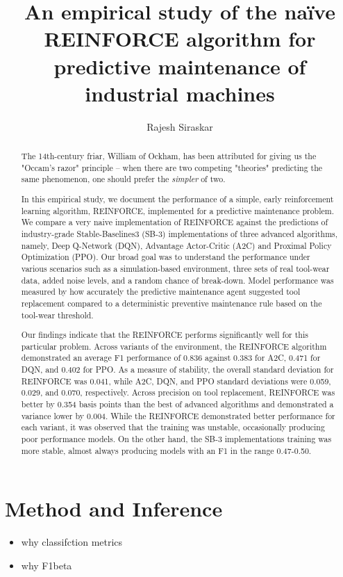 \documentclass[]{article}
\title{An empirical study of the na\"ive REINFORCE algorithm for predictive maintenance of industrial machines}
\author{Rajesh Siraskar}
\begin{document}
\maketitle

\begin{abstract}
The 14th-century friar, William of Ockham, has been attributed for giving us the "Occam's razor" principle -- when there are two competing "theories" predicting the same phenomenon, one should prefer the \textit{simpler} of two.

In this empirical study, we document the performance of a simple, early reinforcement learning algorithm, REINFORCE, implemented for a predictive maintenance problem. We compare a very naive implementation of REINFORCE against the predictions of industry-grade Stable-Baselines3 (SB-3) implementations of three advanced algorithms, namely, Deep Q-Network (DQN), Advantage Actor-Critic (A2C) and Proximal Policy Optimization (PPO). Our broad goal was to understand the performance under various scenarios such as a simulation-based environment, three sets of real tool-wear data, added noise levels, and a random chance of break-down. Model performance was measured by how accurately the predictive maintenance agent suggested tool replacement compared to a deterministic preventive maintenance rule based on the tool-wear threshold. 

Our findings indicate that the REINFORCE performs significantly well for this particular problem. Across variants of the environment, the REINFORCE algorithm demonstrated an average F1 performance of 0.836 against 0.383 for A2C, 0.471 for DQN, and 0.402 for PPO. As a measure of stability, the overall standard deviation for REINFORCE was 0.041, while A2C, DQN, and PPO standard deviations were 0.059, 0.029, and 0.070, respectively. Across precision on tool replacement, REINFORCE was better by 0.354 basis points than the best of advanced algorithms and demonstrated a variance lower by 0.004. While the REINFORCE demonstrated better performance for each variant, it was observed that the training was unstable, occasionally producing poor performance models. On the other hand, the SB-3 implementations training was more stable, almost always producing models with an F1 in the range 0.47-0.50.


\end{abstract}


\section{Method and Inference}
\begin{itemize}
	\item why classifction metrics
	\item why F1beta
\end{itemize}
\end{document}

